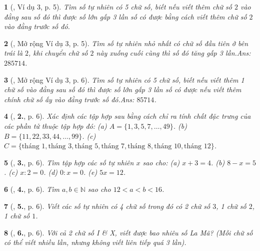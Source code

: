 \documentclass{article}
\newtheorem{baitoan}{}
\begin{document}
\begin{baitoan}[\cite{Binh_Toan_6_tap_1}, Ví dụ 3, p. 5]
	Tìm số tự nhiên có 5 chữ số, biết nếu viết thêm chữ số $2$ vào đằng sau số đó thì được số lớn gấp 3 lần số có được bằng cách viết thêm chữ số $2$ vào đằng trước số đó.
\end{baitoan}

\begin{baitoan}[\cite{Binh_Toan_6_tap_1}, Mở rộng Ví dụ 3, p. 5]
	Tìm số tự nhiên nhỏ nhất có chữ số đầu tiên ở bên trái là $2$, khi chuyển chữ số $2$ này xuống cuối cùng thì số đó tăng gấp 3 lần.\hfill{\sf Ans:} $285714$.
\end{baitoan}

\begin{baitoan}[\cite{Binh_Toan_6_tap_1}, Mở rộng Ví dụ 3, p. 6]
	Tìm số tự nhiên có 5 chữ số, biết nếu viết thêm 1 chữ số vào đằng sau số đó thì được số lớn gấp 3 lần số có được nếu viết thêm chính chữ số ấy vào đằng trước số đó.\hfill{\sf Ans:} $85714$.
\end{baitoan}

\begin{baitoan}[\cite{Binh_Toan_6_tap_1}, \textbf{2.}, p. 6]
	Xác định các tập hợp sau bằng cách chỉ ra tính chất đặc trưng của các phần tử thuộc tập hợp đó: (a) $A = \{1,3,5,7,\ldots,49\}$. (b) $B = \{11,22,33,44,\ldots,99\}$. (c) $C = \{\mbox{tháng } 1,\mbox{tháng } 3,\mbox{tháng } 5,\mbox{tháng } 7,\mbox{tháng } 8,\mbox{tháng } 10,\mbox{tháng } 12\}$.
\end{baitoan}

\begin{baitoan}[\cite{Binh_Toan_6_tap_1}, \textbf{3.}, p. 6]
	Tìm tập hợp các số tự nhiên $x$ sao cho: (a) $x + 3 = 4$. (b) $8 - x = 5$. (c) $x:2 = 0$. (d) $0:x = 0$. (e) $5x = 12$.
\end{baitoan}

\begin{baitoan}[\cite{Binh_Toan_6_tap_1}, \textbf{4.}, p. 6]
	Tìm $a,b\in\mathbb{N}$ sao cho $12 < a < b < 16$.
\end{baitoan}

\begin{baitoan}[\cite{Binh_Toan_6_tap_1}, \textbf{5.}, p. 6]
	Viết các số tự nhiên có 4 chữ số trong đó có 2 chữ số $3$, 1 chữ số $2$, 1 chữ số $1$.
\end{baitoan}

\begin{baitoan}[\cite{Binh_Toan_6_tap_1}, \textbf{6.}, p. 6]
	Với cả 2 chữ số I \& X, viết được bao nhiêu số La Mã? (Mỗi chữ số có thể viết nhiều lần, nhưng không viết liên tiếp quá 3 lần).
\end{baitoan}
\end{document}
